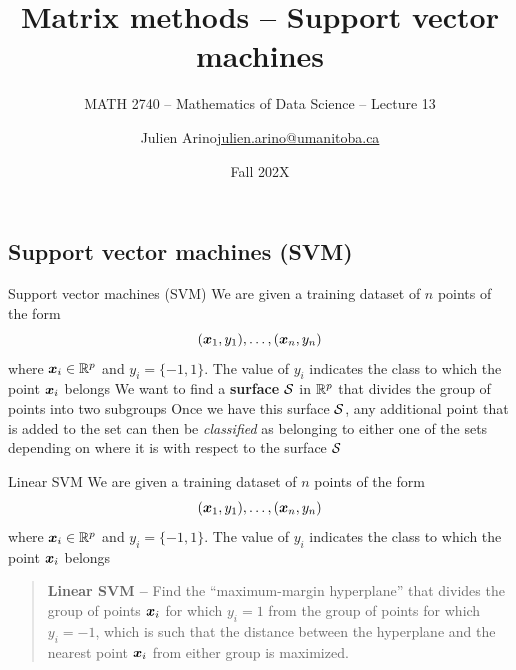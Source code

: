 \documentclass[aspectratio=169]{beamer}\usepackage[]{graphicx}\usepackage[]{xcolor}
\subtitle{MATH 2740 -- Mathematics of Data Science -- Lecture 13}
\author{\texorpdfstring{Julien Arino\newline\url{julien.arino@umanitoba.ca}}{Julien Arino}}
\institute{Department of Mathematics @ University of Manitoba}
\date{Fall 202X}
\title{Matrix methods -- Support vector machines}
\begin{document}







\subsection{Support vector machines (SVM)}

\begin{frame}{Support vector machines (SVM)}
    We are given a training dataset of $n$ points of the form
    \[ 
        (\bx_1, y_1), \ldots, (\bx_n, y_n)
    \]
    where $\bx_i\in\IR^p$ and $y_i=\{-1,1\}$. The value of $y_i$ indicates the class to which the point $\bx_i $ belongs
    \vfill
    We want to find a \textbf{surface} $\S$ in $\IR^p$ that divides the group of points into two subgroups
    \vfill
    Once we have this surface $\S$, any additional point that is added to the set can then be \emph{classified} as belonging to either one of the sets depending on where it is with respect to the surface $\S$
\end{frame}

\begin{frame}{Linear SVM}
    We are given a training dataset of $n$ points of the form
    \[ 
        (\bx_1, y_1), \ldots, (\bx_n, y_n)
    \]
    where $\bx_i\in\IR^p$ and $y_i=\{-1,1\}$. The value of $y_i$ indicates the class to which the point $\bx_i $ belongs
    \vfill
    \begin{quote}\textbf{Linear SVM --}
        Find the ``maximum-margin hyperplane'' that divides the group of points $\bx_i$ for which $y_i = 1$ from the group of points for which $y_i = -1$, which is such that the distance between the hyperplane and the nearest point $\bx_i$ from either group is maximized.
    \end{quote}
\end{frame}
\end{document}
